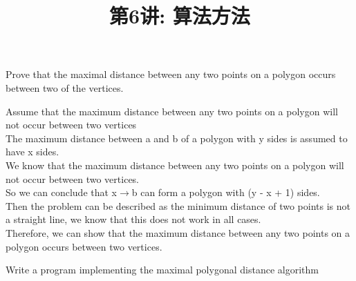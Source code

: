 \documentclass[a4paper, justified]{tufte-handout}
\title{第6讲: 算法方法}
\date{\zhtoday} %
\begin{document}
\maketitle
\noplagiarism %
\begin{abstract}
\end{abstract}
\beginrequired

\begin{problem}[DH 4-8]
Prove that the maximal distance between any two points on a polygon occurs between two of the vertices.
\end{problem}

\begin{solution}
  Assume that the maximum distance between any two points on a polygon will not occur between two vertices\\
  The maximum distance between a and b of a polygon with y sides is assumed to have x sides.\\
  We know that the maximum distance between any two points on a polygon will not occur between two vertices.\\
  So we can conclude that x$\to$b can form a polygon with (y - x + 1) sides.\\
  Then the problem can be described as the minimum distance of two points is not a straight line, we know that this does not work in all cases.\\
  Therefore, we can show that the maximum distance between any two points on a polygon occurs between two vertices.
\end{solution}

\begin{problem}[DH 4-9]
Write a program implementing the maximal polygonal distance algorithm
\end{problem}
\end{document}
